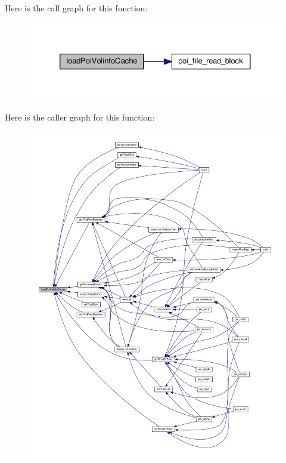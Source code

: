 Here is the call graph for this function\-:\nopagebreak
\begin{figure}[H]
\begin{center}
\leavevmode
\includegraphics[width=324pt]{volume-information_8h_af6d08c2f02ba561e21c8aeef199e20f2_cgraph}
\end{center}
\end{figure}




Here is the caller graph for this function\-:\nopagebreak
\begin{figure}[H]
\begin{center}
\leavevmode
\includegraphics[width=350pt]{volume-information_8h_af6d08c2f02ba561e21c8aeef199e20f2_icgraph}
\end{center}
\end{figure}


